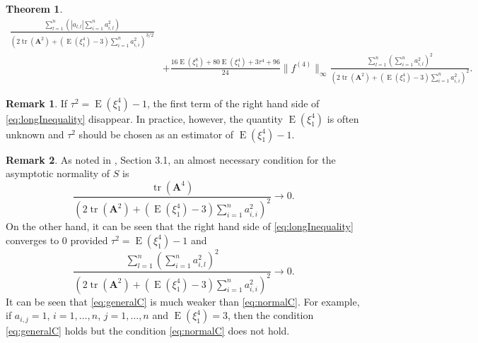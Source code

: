 \documentclass[11pt]{article}
\DeclareMathOperator{\mytr}{tr}
\DeclareMathOperator{\myE}{E}
\newcommand{\BA}{\mathbf{A}}    \newcommand{\BB}{\mathbf{B}}    \newcommand{\BC}{\mathbf{C}}    \newcommand{\BD}{\mathbf{D}}    \newcommand{\BE}{\mathbf{E}}    \newcommand{\BF}{\mathbf{F}}    \newcommand{\BG}{\mathbf{G}}    \newcommand{\BH}{\mathbf{H}}    \newcommand{\BI}{\mathbf{I}}    \newcommand{\BJ}{\mathbf{J}}    \newcommand{\BK}{\mathbf{K}}    \newcommand{\BL}{\mathbf{L}}
\theoremstyle{plain}
\newtheorem{theorem}{\quad\quad Theorem}
\theoremstyle{definition}
\newtheorem{remark}{\quad\quad Remark}
\theoremstyle{remark}
\begin{document}
\begin{theorem}
\begin{equation}
\begin{split}
            \frac{
            \sum_{l=1}^n 
            \left(|a_{l,l}|
         \sum_{i=1}^{n} a_{i,l}^2 
     \right)
 }{
    \left(
        2 \mytr(\BA^2)
    +
    (\myE (\xi_1^4)-3) \sum_{i=1}^n a_{i,i}^2
\right)^{3/2}
 }
         \\
            &+
            \frac{
             16 \myE (\xi_1^8) + 80 \myE (\xi_1^4) + 3\tau^4 + 96 
            }{24} \|f^{(4)} \|_{\infty} 
            \frac{
                \sum_{l=1}^n \left( \sum_{i=1}^n a_{i,l}^2 \right)^2
            }{
            \left(
        2 \mytr(\BA^2)
    +
    (\myE (\xi_1^4)-3)\sum_{i=1}^n a_{i,i}^2
\right)^{2}
            }
            .
        \end{split}
    \end{equation}
    \label{approximation}
\end{theorem}
\begin{remark}
    If $\tau^2=\myE (\xi_1^4) -1$, the first term of the right hand side of \eqref{eq:longInequality} disappear.
    In practice, however, the quantity $\myE (\xi_1^4)$ is often unknown and
    $\tau^2$ should be chosen as an estimator of $\myE (\xi_1^4)-1$.
\end{remark}

\begin{remark}
    As noted in \cite{Chatterjee2008}, Section 3.1, an almost necessary condition for the asymptotic normality of $S$ is
    \begin{equation}\label{eq:normalC}
        \frac{\mytr (\BA^4)}{
            \left( 
        2 \mytr(\BA^2)
    +
    (\myE (\xi_1^4)-3)\sum_{i=1}^n a_{i,i}^2
            \right)^2
        }\to 0. 
    \end{equation}
    On the other hand, it can be seen that the right hand side of \eqref{eq:longInequality} converges to $0$ provided $\tau^2=\myE (\xi_1^4)-1$ and
    \begin{equation}\label{eq:generalC}
            \frac{
                \sum_{l=1}^n \left( \sum_{i=1}^n a_{i,l}^2 \right)^2
            }{
            \left(
        2 \mytr(\BA^2)
    +
    (\myE (\xi_1^4)-3)\sum_{i=1}^n a_{i,i}^2
\right)^{2}
            }
            \to 0.
    \end{equation}
    It can be seen that \eqref{eq:generalC} is much weaker than \eqref{eq:normalC}.
    For example, if $a_{i,j}=1$, $i=1,\ldots, n$, $j=1,\ldots, n$ and $\myE (\xi_1^4)=3$, then the condition \eqref{eq:generalC} holds but the condition \eqref{eq:normalC} does not hold.
\end{remark}
\end{document}
